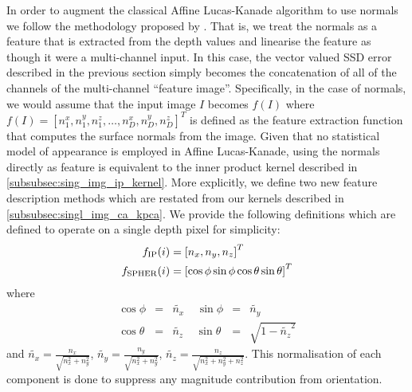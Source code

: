 In order to augment the classical Affine Lucas-Kanade algorithm to use normals
we follow the methodology proposed by \citet{antonakos2015feature}. That is,
we treat the normals as a feature that is extracted from the depth values
and linearise the feature as though it were a multi-channel input. In this case,
the vector valued SSD error described in the previous section simply
becomes the concatenation of all of the channels of the multi-channel
``feature image''. Specifically, in the case of normals, we would assume
that the input image $I$ becomes $f(I)$ where
$f(I) = {[n^x_1, n^y_1, n^z_1, \ldots, n^x_D, n^y_D, n^z_D]}^T$ is defined as
the feature extraction function that computes the surface normals from the
image. Given that no statistical model of appearance is employed in Affine
Lucas-Kanade, using the normals directly as feature is equivalent to
the inner product kernel described in \cref{subsubsec:sing_img_ip_kernel}.
More explicitly, we define two new feature description methods which are
restated from our kernels described in \cref{subsubsec:singl_img_ca_kpca}.
We provide the following definitions which are defined to operate on a single
depth pixel for simplicity:
\begin{equation}
    \begin{aligned}\label{eq:normal_feature_functions}
        f_{\operatorname{IP}}(i)    &= {[n_x, n_y, n_z]}^T \\
        f_{\operatorname{SPHER}}(i) &= {[\cos \phi \sin \phi \cos \theta \sin \theta]}^T
    \end{aligned}
\end{equation}
where
\begin{equation}
    \begin{aligned}\label{eq:normalised-spherical}
        \cos \phi   &=& \tilde{n_x} \;\;\;\; \sin \phi   &=& \tilde{n_y} \\
        \cos \theta &=& \tilde{n_z} \;\;\;\; \sin \theta &=& \sqrt{1 - {\tilde{n_z}}^2}
    \end{aligned}
\end{equation}
and $\tilde{n_x} = \frac{n_x}{\sqrt{n_x^2 + n_y^2}}$,
$\tilde{n_y} = \frac{n_y}{\sqrt{n_x^2 + n_y^2}}$,
$\tilde{n_z} = \frac{n_z}{\sqrt{n_x^2 + n_y^2 + n_z^2}}$.
This normalisation of each component is done to suppress any magnitude
contribution from orientation.

